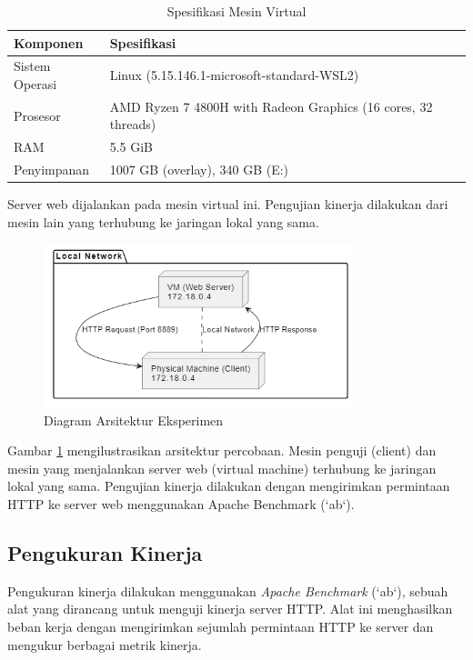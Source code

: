 \documentclass[12pt]{article}
\begin{document}
\begin{table}[h]
\centering
\caption{Spesifikasi Mesin Virtual}
\label{tab:vm_specs}
\begin{tabular}{|l|l|}
\hline
\textbf{Komponen} & \textbf{Spesifikasi} \\ \hline
Sistem Operasi & Linux (5.15.146.1-microsoft-standard-WSL2) \\ 
Prosesor & AMD Ryzen 7 4800H with Radeon Graphics (16 cores, 32 threads) \\
RAM & 5.5 GiB \\
Penyimpanan & 1007 GB (overlay), 340 GB (E:) \\
\hline
\end{tabular}
\end{table}

Server web dijalankan pada mesin virtual ini. Pengujian kinerja dilakukan dari mesin lain yang terhubung ke jaringan lokal yang sama. 

\begin{figure}[h!]
\centering
\includegraphics[width=0.8\textwidth]{img/architecture_diagram.png}
\caption{Diagram Arsitektur Eksperimen}
\label{fig:arch}
\end{figure}

Gambar \ref{fig:arch} mengilustrasikan arsitektur percobaan. Mesin penguji (client) dan mesin yang menjalankan server web (virtual machine) terhubung ke jaringan lokal yang sama. Pengujian kinerja dilakukan dengan mengirimkan permintaan HTTP ke server web menggunakan Apache Benchmark (`ab`). 

\subsection{Pengukuran Kinerja}

Pengukuran kinerja dilakukan menggunakan \textit{Apache Benchmark} (`ab`), sebuah alat yang dirancang untuk menguji kinerja server HTTP. Alat ini menghasilkan beban kerja dengan mengirimkan sejumlah permintaan HTTP ke server dan mengukur berbagai metrik kinerja. 
\end{document}
